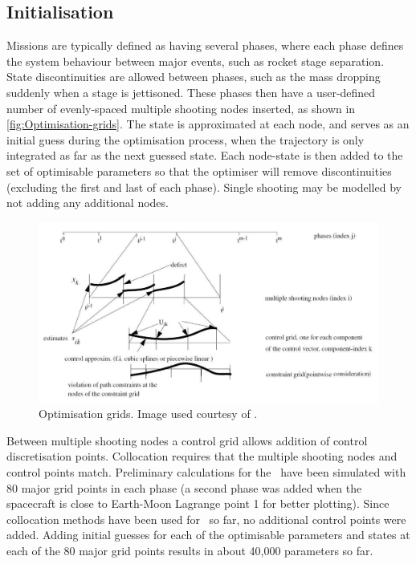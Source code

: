 \subsection{Initialisation} \label{sub:GESOP-Initialisation}

Missions are typically defined as having several phases, where each phase defines the system behaviour between major events, such as rocket stage separation. State discontinuities are allowed between phases, such as the mass dropping suddenly when a stage is jettisoned. These phases then have a user-defined number of evenly-spaced multiple shooting nodes inserted, as shown in \autoref{fig:Optimisation-grids}. The state is approximated at each node, and serves as an initial guess during the optimisation process, when the trajectory is only integrated as far as the next guessed state. Each node-state is then added to the set of optimisable parameters so that the optimiser will remove discontinuities (excluding the first and last of each phase). Single shooting may be modelled by not adding any additional nodes.

\begin{figure}
\begin{center}
\includegraphics[width=\textwidth]{Images/control_nodes.pdf}
\end{center}
\caption{Optimisation grids. Image used courtesy of \textcite{ASTOS_guide}.}
\label{fig:Optimisation-grids}
\end{figure}

Between multiple shooting nodes a control grid allows addition of control discretisation points. Collocation requires that the multiple shooting nodes and control points match. Preliminary calculations for the \BW\ have been simulated with 80 major grid points in each phase (a second phase was added when the spacecraft is close to Earth-Moon Lagrange point 1 for better plotting). Since collocation methods have been used for \BW\ so far, no additional control points were added. Adding initial guesses for each of the optimisable parameters and states at each of the 80 major grid points results in about 40,000 parameters so far.

